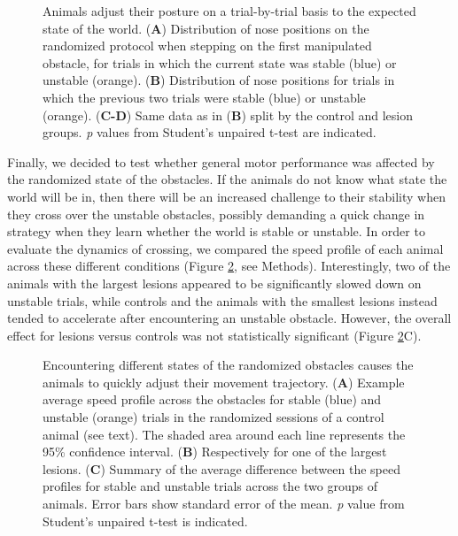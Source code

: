 \begin{figure}
\centering

\caption{Animals adjust their posture on a trial-by-trial basis to the expected state of the world. (\textbf{A}) Distribution of nose positions on the randomized protocol when stepping on the first manipulated obstacle, for trials in which the current state was stable (blue) or unstable (orange). (\textbf{B}) Distribution of nose positions for trials in which the previous two trials were stable (blue) or unstable (orange). (\textbf{C-D}) Same data as in (\textbf{B}) split by the control and lesion groups. \emph{p} values from Student's unpaired t-test are indicated.}
\label{fig:random}
\end{figure}

Finally, we decided to test whether general motor performance was affected by the randomized state of the obstacles. If the animals do not know what state the world will be in, then there will be an increased challenge to their stability when they cross over the unstable obstacles, possibly demanding a quick change in strategy when they learn whether the world is stable or unstable. In order to evaluate the dynamics of crossing, we compared the speed profile of each animal across these different conditions (Figure \ref{fig:speed}, see Methods). Interestingly, two of the animals with the largest lesions appeared to be significantly slowed down on unstable trials, while controls and the animals with the smallest lesions instead tended to accelerate after encountering an unstable obstacle. However, the overall effect for lesions versus controls was not statistically significant (Figure \ref{fig:speed}C).

\begin{figure}
\centering

\caption{Encountering different states of the randomized obstacles causes the animals to quickly adjust their movement trajectory. (\textbf{A}) Example average speed profile across the obstacles for stable (blue) and unstable (orange) trials in the randomized sessions of a control animal (see text). The shaded area around each line represents the 95\% confidence interval. (\textbf{B}) Respectively for one of the largest lesions. (\textbf{C}) Summary of the average difference between the speed profiles for stable and unstable trials across the two groups of animals. Error bars show standard error of the mean. \emph{p} value from Student's unpaired t-test is indicated.}
\label{fig:speed}
\end{figure}

